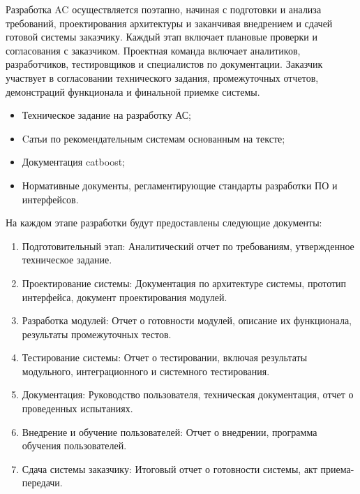 Разработка AC осуществляется поэтапно,
начиная с подготовки и анализа требований,
проектирования архитектуры и заканчивая внедрением
и сдачей готовой системы заказчику.
Каждый этап включает плановые проверки и согласования с заказчиком.
Проектная команда включает аналитиков, разработчиков,
тестировщиков и специалистов по документации.
Заказчик участвует в согласовании технического задания,
промежуточных отчетов, демонстраций функционала и финальной приемке системы.


\begin{itemize}
	\item Техническое задание на разработку АС;
	\item Cатьи по рекомендательным системам основанным на тексте;
	\item Документация catboost;
	\item Нормативные документы,
	регламентирующие стандарты разработки ПО и интерфейсов.
\end{itemize}


На каждом этапе разработки будут предоставлены следующие документы:

\begin{enumerate}
	\item Подготовительный этап:
	Аналитический отчет по требованиям, утвержденное техническое задание.
	\item Проектирование системы:
	Документация по архитектуре системы,
	прототип интерфейса, документ проектирования модулей.
	\item Разработка модулей:
	Отчет о готовности модулей, описание их функционала,
	результаты промежуточных тестов.
	\item Тестирование системы:
	Отчет о тестировании, включая результаты модульного,
	интеграционного и системного тестирования.
	\item Документация:
	Руководство пользователя, техническая документация,
	отчет о проведенных испытаниях.
	\item Внедрение и обучение пользователей:
	Отчет о внедрении, программа обучения пользователей.
	\item Сдача системы заказчику:
	Итоговый отчет о готовности системы, акт приема-передачи.
\end{enumerate}


